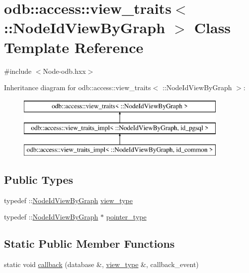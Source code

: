 \hypertarget{classodb_1_1access_1_1view__traits_3_01_1_1_node_id_view_by_graph_01_4}{}\section{odb\+:\+:access\+:\+:view\+\_\+traits$<$ \+:\+:Node\+Id\+View\+By\+Graph $>$ Class Template Reference}
\label{classodb_1_1access_1_1view__traits_3_01_1_1_node_id_view_by_graph_01_4}


{\ttfamily \#include $<$Node-\/odb.\+hxx$>$}

Inheritance diagram for odb\+:\+:access\+:\+:view\+\_\+traits$<$ \+:\+:Node\+Id\+View\+By\+Graph $>$\+:\begin{figure}[H]
\begin{center}
\leavevmode
\includegraphics[height=3.000000cm]{d4/d8e/classodb_1_1access_1_1view__traits_3_01_1_1_node_id_view_by_graph_01_4}
\end{center}
\end{figure}
\subsection*{Public Types}
\begin{DoxyCompactItemize}
\item 
typedef \+::\hyperlink{struct_node_id_view_by_graph}{Node\+Id\+View\+By\+Graph} \hyperlink{classodb_1_1access_1_1view__traits_3_01_1_1_node_id_view_by_graph_01_4_ab7f6466684b7fbf4cae9f4ca22fec881}{view\+\_\+type}
\item 
typedef \+::\hyperlink{struct_node_id_view_by_graph}{Node\+Id\+View\+By\+Graph} $\ast$ \hyperlink{classodb_1_1access_1_1view__traits_3_01_1_1_node_id_view_by_graph_01_4_ac87934267a618836f611ce84e918041d}{pointer\+\_\+type}
\end{DoxyCompactItemize}
\subsection*{Static Public Member Functions}
\begin{DoxyCompactItemize}
\item 
static void \hyperlink{classodb_1_1access_1_1view__traits_3_01_1_1_node_id_view_by_graph_01_4_a58a05d15f19feec5db5b1105dfc96101}{callback} (database \&, \hyperlink{classodb_1_1access_1_1view__traits_3_01_1_1_node_id_view_by_graph_01_4_ab7f6466684b7fbf4cae9f4ca22fec881}{view\+\_\+type} \&, callback\+\_\+event)
\end{DoxyCompactItemize}


